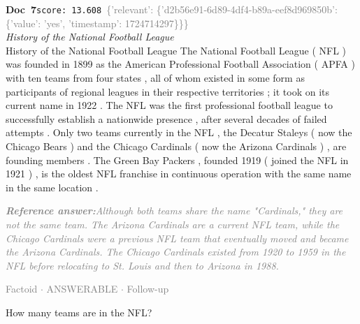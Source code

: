 \documentclass[a4paper,11pt]{article}
\begin{document}
\begin{docenv}
{\footnotesize\textcolor{doccolor}{\textbf{Doc~7}}}\hfill{\tiny\texttt{score:~13.608}}\ {\tiny\textcolor{gray}{\{'relevant': \{'d2b56e91-6d89-4df4-b89a-eef8d969850b': \{'value': 'yes', 'timestamp': 1724714297\}\}\}}}\\[3pt]
{\small\textit{History of the National Football League}}\\[2pt]
\vspace{2pt}
{\footnotesize History of the National Football League
The National Football League ( NFL ) was founded in 1899 as the American Professional Football Association ( APFA ) with ten teams from four states , all of whom existed in some form as participants of regional leagues in their respective territories ; it took on its current name in 1922 . The NFL was the first professional football league to successfully establish a nationwide presence , after several decades of failed attempts . Only two teams currently in the NFL , the Decatur Staleys ( now the Chicago Bears ) and the Chicago Cardinals ( now the Arizona Cardinals ) , are founding members . The Green Bay Packers , founded 1919 ( joined the NFL in 1921 ) , is the oldest NFL franchise in continuous operation with the same name in the same location .}
\end{docenv}
\begin{refanswerenv}
{\footnotesize\textit{\textcolor{gray}{\textbf{Reference answer:}\enspace Although both teams share the name "Cardinals," they are not the same team. The Arizona Cardinals are a current NFL team, while the Chicago Cardinals were a previous NFL team that eventually moved and became the Arizona Cardinals. The Chicago Cardinals existed from 1920 to 1959 in the NFL before relocating to St. Louis and then to Arizona in 1988.}}}
\end{refanswerenv}
\vspace{0.5em}
\hfill{\tiny\textcolor{gray}{Factoid $\cdot$ ANSWERABLE $\cdot$ Follow-up}}
\begin{userbubble}
How many teams are in the NFL?
\end{userbubble}
\end{document}
